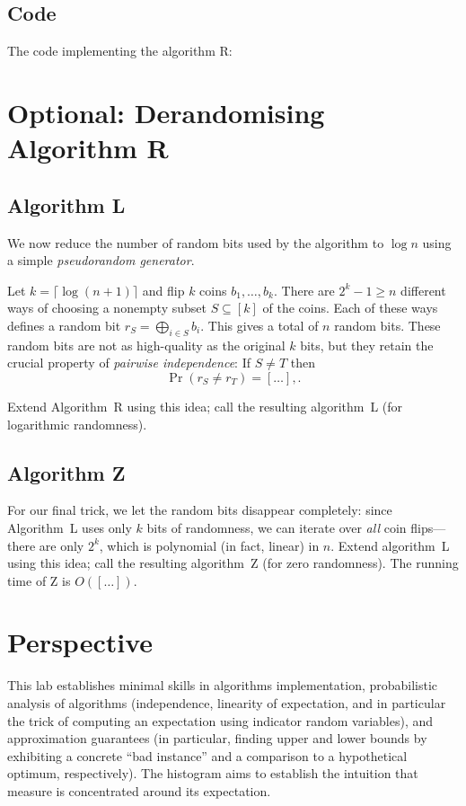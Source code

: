 \documentclass{tufte-handout}
\begin{document}
\subsection{Code}

The code implementing the algorithm R:


\newpage
\section{Optional: Derandomising Algorithm R}

\subsection{Algorithm L} 


We now reduce the number of random bits used by the algorithm to $\log
n$ using a simple \emph{pseudorandom generator}.


Let $k=\lceil\log (n+1)\rceil$ and flip $k$ coins $b_1,\ldots, b_k$.
There are $2^k -1 \geq n$ different ways of choosing a nonempty subset
$S\subseteq [k]$ of the coins.
Each of these ways defines a random bit $r_S =\bigoplus_{i\in S} b_i$.
This gives a total of $n$ random bits.
These random bits are not as high-quality as the original $k$ bits,
but they retain the crucial property of \emph{pairwise independence}:
If $S\neq T$ then 
\[ \Pr(r_S\neq r_T) = [\ldots],.\]

Extend Algorithm~R using this idea; call the resulting
algorithm~L (for logarithmic randomness).

\subsection{Algorithm Z}

For our final trick, we let the random bits disappear completely:
since Algorithm~L uses only $k$ bits of randomness, we can iterate
over \emph{all} coin flips---there are only $2^k$, which is polynomial
(in fact, linear) in $n$.
Extend algorithm~L using this idea; call the resulting algorithm~Z
(for zero randomness).
The running time of Z is $O([\ldots])$.

\newpage
\section{Perspective}

This lab establishes minimal skills in algorithms implementation,
probabilistic analysis of algorithms (independence, linearity of
expectation, and in particular the trick of computing an expectation
using indicator random variables), and approximation guarantees (in
particular, finding upper and lower bounds by exhibiting a concrete
``bad instance'' and a comparison to a hypothetical optimum,
respectively).
The histogram aims to establish the intuition that measure is
concentrated around its expectation.
\end{document}

